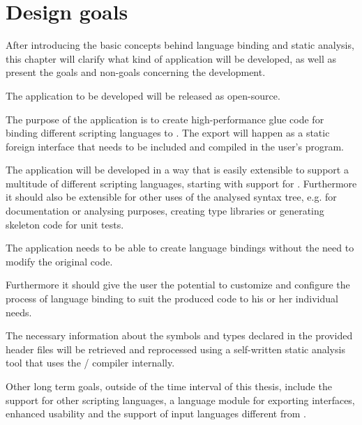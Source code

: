 \chapter{Design goals}
\label{chap:DesignGoals}

After introducing the basic concepts behind language binding and static analysis, this chapter will clarify what kind of application will be developed, as well as present the goals and non-goals concerning the development.

The application to be developed will be released as open-source.

The purpose of the application is to create high-performance glue code for binding different scripting languages to . The export will happen as a static foreign interface that needs to be included and compiled in the user's program.

The application will be developed in a way that is easily extensible to support a multitude of different scripting languages, starting with support for . Furthermore it should also be extensible for other uses of the analysed  syntax tree, e.g. for documentation or analysing purposes, creating type libraries or generating skeleton code for unit tests.

The application needs to be able to create language bindings without the need to modify the original code.

Furthermore it should give the user the potential to customize and configure the process of language binding to suit the produced code to his or her individual needs.

The necessary information about the symbols and types declared in the provided  header files will be retrieved and reprocessed using a self-written static analysis tool that uses the  / compiler internally.

Other long term goals, outside of the time interval of this thesis, include the support for other scripting languages, a language module for exporting  interfaces, enhanced usability and the support of input languages different from .